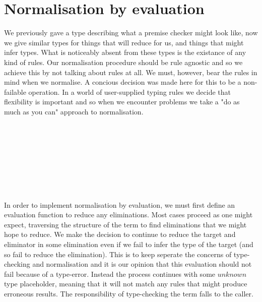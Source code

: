 \section{Normalisation by evaluation}

We previously gave a type describing what a premise checker might look like, now
we give similar types for things that will reduce for us, and things that might
infer types. What is noticeably absent from these types is the existance of any kind
of rules. Our normalisation procedure should be rule agnostic and so we achieve this
by not talking about rules at all. We must, however, bear the rules in mind when
we normalise. A concious decision was made here for this to be a non-failable
operation. In a world of user-supplied typing rules we decide that flexibility
is important and so when we encounter problems we take a "do as much as you can"
approach to normalisation. 
\begin{code}%
\>[0]%
\>[9]\AgdaSymbol{=}%
\>[13]\AgdaSpace{}%
\AgdaSymbol{\{}\AgdaSymbol{\}}%
\>[40]\<%
\\
%
\>[13]\AgdaSpace{}%
%
\>[40]\<%
\\
%
\>[13]\AgdaSymbol{(}\AgdaSpace{}%
\AgdaSpace{}%
\AgdaSpace{}%
\AgdaSymbol{:}\AgdaSpace{}%
\AgdaSpace{}%
\AgdaSymbol{)}%
\>[40]\<%
\\
%
\>[13]\AgdaSpace{}%
\AgdaSymbol{(}\AgdaSpace{}%
\AgdaSymbol{)}\<%
\\
\>[0]%
\>[9]\AgdaSymbol{=}%
\>[13]\AgdaSpace{}%
\AgdaSymbol{\{}\AgdaSymbol{\}}%
\>[40]\<%
\\
%
\>[13]\AgdaSpace{}%
%
\>[40]\<%
\\
%
\>[13]\AgdaSymbol{(}\AgdaSpace{}%
\AgdaSymbol{:}\AgdaSpace{}%
\AgdaSpace{}%
\AgdaSpace{}%
\AgdaSymbol{)}%
\>[40]\<%
\\
%
\>[13]\AgdaSpace{}%
\AgdaSymbol{(}\AgdaSpace{}%
\AgdaSpace{}%
\AgdaSymbol{)}\<%
\end{code}
In order to implement normalisation by evaluation, we must first define an evaluation
function to reduce any eliminations. Most cases proceed as one might expect,
traversing the structure of the term to find eliminations that we might hope to
reduce. We make the decision to continue to reduce the target and eliminator in
some elimination even if we fail to infer the type of the target (and so fail to
reduce the elimination). This is to keep seperate the concerns of type-checking
and normalisation and it is our opinion that this evaluation should not fail
because of a type-error. Instead the process continues with some $unknown$ type
placeholder, meaning that it will not match any rules that might produce erroneous
results. The responsibility of type-checking the term falls to the caller.


